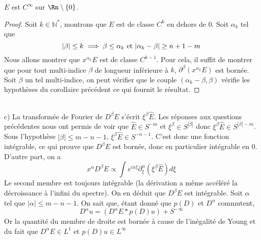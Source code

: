 \documentclass[11pt,a4paper]{article}
\begin{document}
\begin{Cor} $E$ est $C^\infty$ sur $\Rn \setminus\{0\}$. 
\begin{proof}
Soit $k \in \mathbb{N}^*$, montrons que $E$ est de  classe $C^k$ en dehors de $0$. Soit $\alpha_k$ tel que
\[|\beta| \leq k  \implies \beta \leq \alpha_k \textup{ et } |\alpha_k - \beta| \geq n + 1 - m\]
Nous allons montrer que $x^{\alpha_k} E$ est de classe $C^{k-1}$. Pour cela, il suffit de montrer que pour tout multi-indice $\beta$ de longueur inférieure à $k$, $\partial^{\beta} (x^{\alpha_k} E)$ est bornée. Soit $\beta$ un tel multi-indice, on peut vérifier que le couple $(\alpha_k - \beta,\beta)$ vérifie les hypothèses du corollaire précédent ce qui fournit le résultat. 
\end{proof}
\end{Cor} 
\text{ }\\
c) La transformée de Fourier de $D^{\beta} E$ s'écrit $\xi^{\beta}  \hat{E}$. Les réponses aux questions précédentes nous ont permis de voir que $\hat{E} \in S^{-m}$ et $\xi^{\beta} \in S^{|\beta|}$ donc $\xi^{\beta}  \hat{E} \in S^{|\beta| - m}$. Sous l'hypothèse $|\beta| \leq m - n - 1$,  $\xi^{\beta}  \hat{E} \in S^{-n-1}$. C'est donc une fonction intégrable, ce qui prouve que $D^{\beta} E$ est bornée, donc en particulier intégrable en $0$. D'autre part, on a 
\[ x^{\alpha} D^{\beta} E \propto \int e^{i x\xi} \partial^\alpha_\xi(\xi^{\beta}  \hat{E}) d\xi\]
Le second membre est toujours intégrable (la dérivation a même accéléré la décroissance à l'infini du spectre). On en déduit que $D^\beta E$ est intégrable.  
Soit $\alpha$ tel que $|\alpha| \leq m - n - 1$. On sait que, étant donné que $p(D)$ et $D^\alpha$ commutent, 
\[ D^\alpha u = \left( D^\alpha E * p(D) u\right) + S^{-\infty}\]
Or la quantité du membre de droite est bornée à cause de l'inégalité de Young et du fait que $D^\alpha E \in L^1$ et $p(D)u \in L^{\infty}$
\text{ }\\
\end{document}
